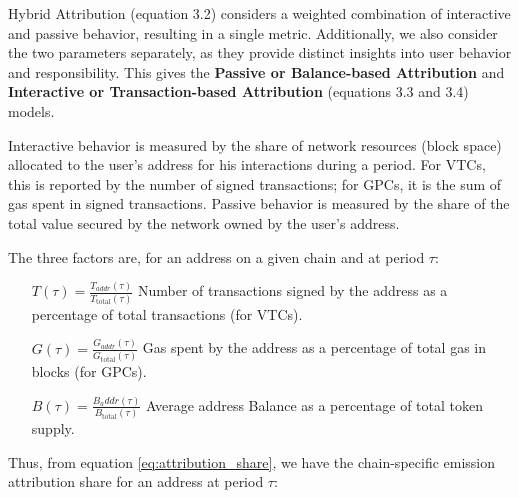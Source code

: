 \documentclass[11pt]{report}
\begin{document}
Hybrid Attribution (equation 3.2) considers a weighted combination of interactive and passive behavior, resulting in a single metric. Additionally, we also consider the two parameters separately, as they provide distinct insights into user behavior and responsibility. This gives the \textbf{Passive or Balance-based Attribution} and \textbf{Interactive or Transaction-based Attribution} (equations 3.3 and 3.4) models.

Interactive behavior is measured by the share of network resources (block space) allocated to the user's address for his interactions during a period. For \ac{VTC}s, this is reported by the number of signed transactions; for \ac{GPC}s, it is the sum of gas spent in signed transactions. Passive behavior is measured by the share of the total value secured by the network owned by the user's address.

The three factors are, for an address on a given chain and at period $\tau$:

\begin{description}[leftmargin=!, labelwidth=\widthof{\bfseries Passive Behavior}]

    \item[Interactive Behavior $(I)$] \hfill
        \begin{itemize}[labelwidth=4cm, align=left, labelsep=0pt]
            \item[\( T(\tau) = \frac{T_{addr}(\tau)}{T_{\text{total}}(\tau)} \)]
                Number of transactions signed by the address as a percentage of total transactions (for VTCs).

            \item[\(G(\tau) = \frac{G_{addr}(\tau)}{G_{\text{total}}(\tau)} \)]
                Gas spent by the address as a percentage of total gas in blocks (for GPCs).
        \end{itemize}

    \item[Passive Behavior $(P)$] \hfil
        \begin{itemize}[labelwidth=4cm, align=left, labelsep=0pt]
            \item[\(B(\tau) = \frac{B_addr(\tau)}{B_{\text{total}}(\tau)} \)]
                Average address Balance as a percentage of total token supply.
        \end{itemize}

\end{description}
\parsep 5pt
Thus, from equation \eqref{eq:attribution_share}, we have the chain-specific emission attribution share for an address at period $\tau$:
\end{document}
